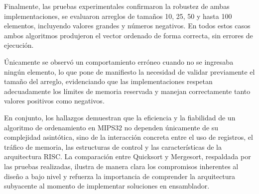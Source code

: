 \documentclass[12pt, letterpaper]{article}
\begin{document}
Finalmente, las pruebas experimentales confirmaron la robustez de ambas implementaciones, se evaluaron arreglos de tamaños 10, 25, 50 y hasta 100 elementos, incluyendo valores grandes y números negativos. En todos estos casos ambos algoritmos produjeron el vector ordenado de forma correcta, sin errores de ejecución. 

Únicamente se observó un comportamiento erróneo cuando no se ingresaba ningún elemento, lo que pone de manifiesto la necesidad de validar previamente el tamaño del arreglo, evidenciando que las implementaciones respetan adecuadamente los límites de memoria reservada y manejan correctamente tanto valores positivos como negativos.

En conjunto, los hallazgos demuestran que la eficiencia y la fiabilidad de un algoritmo de ordenamiento en MIPS32 no dependen únicamente de su complejidad asintótica, sino de la interacción concreta entre el uso de registros, el tráfico de memoria, las estructuras de control y las características de la arquitectura RISC. La comparación entre Quicksort y Mergesort, respaldada por las pruebas realizadas, ilustra de manera clara los compromisos inherentes al diseño a bajo nivel y refuerza la importancia de comprender la arquitectura subyacente al momento de implementar soluciones en ensamblador.
\end{document}

